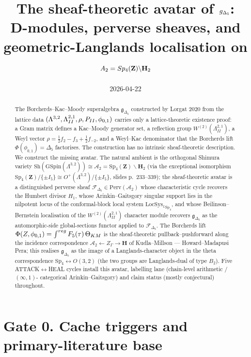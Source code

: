 \documentclass[11pt]{amsart}
\title{The sheaf-theoretic avatar of $\gDfive$:\\
D-modules, perverse sheaves, and geometric-Langlands localisation on
$\mathcal{A}_2 = \Sp_4(\bZ) \backslash \bH_2$}
\author{}
\date{2026-04-22}
\theoremstyle{definition}
\providecommand{\Perv}{\mathrm{Perv}}
\providecommand{\Sh}{\mathrm{Sh}}
\providecommand{\LocSys}{\mathrm{LocSys}}
\providecommand{\GSpin}{\mathrm{GSpin}}
\providecommand{\Sp}{\mathrm{Sp}}
\providecommand{\cF}{\mathcal{F}}
\providecommand{\bZ}{\mathbf{Z}}
\providecommand{\bH}{\mathbf{H}}
\providecommand{\Dfive}{\Delta_5}
\providecommand{\gDfive}{\mathfrak{g}_{\Dfive}}
\begin{document}
\maketitle

\begin{abstract}
The Borcherds--Kac--Moody superalgebra $\gDfive$ constructed by
Lorgat 2020 from the lattice data $(\Lambda^{3,2}, \Lambda^{2,1}_{II},
\rho, P_{II}, \phi_{0,1})$ carries only a lattice-theoretic
existence proof: a Gram matrix defines a Kac--Moody generator set,
a reflection group $W^{(2)}(\Lambda^{2,1}_{II})$, a Weyl vector
$\rho = \tfrac{1}{2}f_2 - f_3 + \tfrac{1}{2}f_{-2}$, and a Weyl--Kac
denominator that the Borcherds lift $\Phi(\phi_{0,1}) = \Dfive$
factorises. The construction has no intrinsic sheaf-theoretic
description.  We construct the missing avatar. The natural ambient
is the orthogonal Shimura variety
$\Sh(\GSpin(\Lambda^{3,2})) \cong \mathcal{A}_2 =
\Sp_4(\bZ)\backslash \bH_2$ (via the exceptional isomorphism
$\Sp_4(\bZ)/\{\pm I_5\} \cong O^+(\Lambda^{3,2})/\{\pm I_5\}$, slides
p.~233--339); the sheaf-theoretic avatar is a distinguished
perverse sheaf $\cF_{\Dfive} \in \Perv(\mathcal{A}_2)$ whose
characteristic cycle recovers the Humbert divisor $H_1$, whose
Arinkin--Gaitsgory singular support lies in the nilpotent locus of
the conformal-block local system $\LocSys_{{}^L\Sp_4}$, and whose
Beilinson--Bernstein localisation of the $W^{(2)}(\Lambda^{2,1}_{II})$
character module recovers $\gDfive$ as the automorphic-side
global-sections functor applied to $\cF_{\Dfive}$. The Borcherds lift
$\Phi(Z, \phi_{0,1}) = \int^{\mathrm{reg}} F_5(\tau)\, \Theta_{\rm KM}$
is the sheaf-theoretic pullback--pushforward along the incidence
correspondence
$\mathcal{A}_2 \leftarrow Z_\Gamma \rightarrow \bH$ of Kudla--Millson
--- Howard--Madapusi Pera; this realises $\gDfive$ as the image of
a Langlands-character object in the theta correspondence
$\Sp_4 \leftrightarrow O(3,2)$ (the two groups are Langlands-dual of
type $B_2$). Five ATTACK$\leftrightarrow$HEAL cycles install this
avatar, labelling lane (chain-level arithmetic / $(\infty,1)$-
categorical Arinkin--Gaitsgory) and claim status (mostly
conjectural) throughout.
\end{abstract}

\section*{Gate 0. Cache triggers and primary-literature base}
\end{document}
